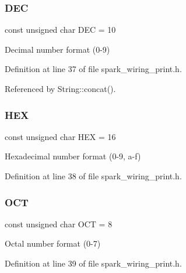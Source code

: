 \subsubsection{D\+EC}
{\footnotesize\ttfamily const unsigned char D\+EC = 10}



Decimal number format (0-\/9) 



Definition at line 37 of file spark\+\_\+wiring\+\_\+print.\+h.



Referenced by String\+::concat().

\mbox{\label{docs_2src_2spark__wiring__print_8h_a777726851dda95dabcc50f606e2dfd8e}} 
\subsubsection{H\+EX}
{\footnotesize\ttfamily const unsigned char H\+EX = 16}



Hexadecimal number format (0-\/9, a-\/f) 



Definition at line 38 of file spark\+\_\+wiring\+\_\+print.\+h.

\mbox{\label{docs_2src_2spark__wiring__print_8h_aeea5c9efade0b29d08f3b5b8336425ad}} 
\subsubsection{O\+CT}
{\footnotesize\ttfamily const unsigned char O\+CT = 8}



Octal number format (0-\/7) 



Definition at line 39 of file spark\+\_\+wiring\+\_\+print.\+h.

